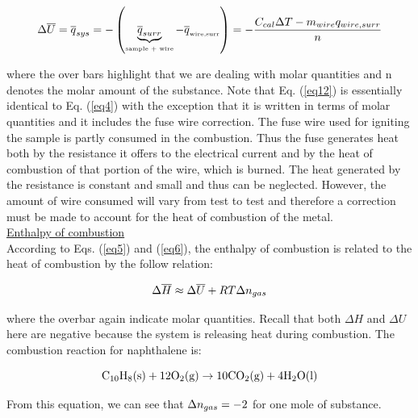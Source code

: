 \documentclass[byrevtex,amssymb,aps,pra,floatfix,letterpaper]{revtex4}
\begin{document}
\begin{equation}
\label{eq13}
\Delta \overline{U} = \overline{q}_{\tiny sys} = -\left( \mathop{\underbrace{\overline{q}_{\tiny surr}}}\limits_\textnormal{\tiny sample + wire} - \overline{q}_\textnormal{\tiny wire,surr}\right) = -\frac{C_{\tiny cal}\Delta T - m_{\tiny wire}q_{\tiny wire,surr}}{n}
\end{equation}

\noindent
where the over bars highlight that we are dealing with molar quantities and n denotes the molar amount of the substance. Note that Eq. (\ref{eq12}) is essentially identical to Eq. (\ref{eq4}) with the exception that it is written in terms of molar quantities and it includes the fuse wire correction. The fuse wire used for igniting the sample is partly consumed in the combustion. Thus the fuse generates heat both by the resistance it offers to the electrical current and by the heat of combustion of that portion of the wire, which is burned. The heat generated by the resistance is constant and small and thus can be neglected. However, the amount of wire consumed will vary from test to test and therefore a correction must be made to account for the heat of combustion of the metal.\\

\noindent
\underline{Enthalpy of combustion}\\

\noindent
According to Eqs. (\ref{eq5}) and (\ref{eq6}), the enthalpy of combustion is related to the heat of combustion by the follow relation:

\begin{equation}
\label{eq14}
\Delta \overline{H} \approx \Delta \overline{U} + RT\Delta n_{\tiny gas}
\end{equation}

\noindent
where the overbar again indicate molar quantities. Recall that both $\Delta H$ and $\Delta U$ here are negative because the system is releasing heat during combustion. The combustion reaction for naphthalene is:

\begin{equation}
\label{eq15}
\textnormal{C}_{10}\textnormal{H}_8(\textnormal{s}) + 12\textnormal{O}_2(\textnormal{g}) \rightarrow 10\textnormal{CO}_2(\textnormal{g}) + 4\textnormal{H}_2\textnormal{O}(\textnormal{l})
\end{equation}

\noindent
From this equation, we can see that $\Delta n_{\tiny gas} = -2$ for one mole of substance.
\end{document}
